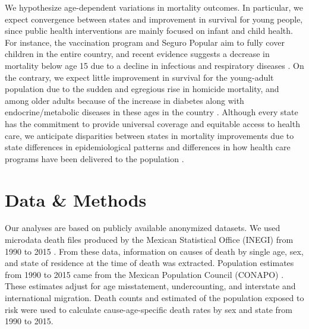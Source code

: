 \documentclass{bmcart}
\begin{document}
We hypothesize age-dependent variations in mortality outcomes.
In particular, we expect convergence between states and improvement in survival
for young people, since public health interventions are mainly focused on infant and child health. For instance, the vaccination program and Seguro Popular aim to fully cover children in the entire country, and recent
evidence suggests a decrease in mortality below age 15 due to a decline
in infectious and respiratory diseases \cite{gonzalez2016mexico}. On the contrary, we
expect little improvement in survival for the young-adult population due to the sudden and egregious rise in homicide mortality, and among older adults because of the increase in diabetes along with endocrine/metabolic diseases in these ages in the country \cite{gonzalez2011health,gonzalez2016mexico}. Although every
state has the commitment to provide universal coverage and equitable access to
health care, we anticipate disparities between states
in mortality improvements due to state differences in epidemiological patterns  \cite{gomez2016dissonant} and differences in how  health care programs have been delivered to the population
\cite{Frenk2006}.


\section*{Data \& Methods} 
Our analyses are based on publicly available anonymized datasets. We used microdata death files produced by the
Mexican Statistical Office (INEGI) from 1990 to 2015 \cite{INEGI}. From these data, 
information on causes of death by single age, sex, and state of residence at the
time of death was extracted. Population estimates from 1990 to 2015 came from the Mexican Population Council (CONAPO) \cite{CONAPO}. These estimates adjust for age misstatement, undercounting, and interstate and international migration. Death counts and estimated of the population exposed to risk were used to calculate cause-age-specific death rates by sex and state from 1990 to 2015.
\end{document}
